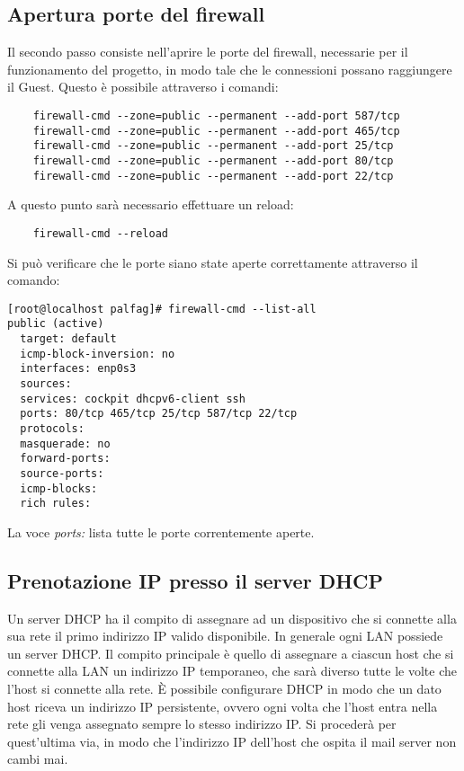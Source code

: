 \subsection{Apertura porte del firewall}

Il secondo passo consiste nell’aprire le porte del firewall, necessarie per il funzionamento del progetto, 
in modo tale che le connessioni possano raggiungere il Guest. Questo è possibile attraverso i comandi:

\begin{verbatim}
    firewall-cmd --zone=public --permanent --add-port 587/tcp
    firewall-cmd --zone=public --permanent --add-port 465/tcp
    firewall-cmd --zone=public --permanent --add-port 25/tcp
    firewall-cmd --zone=public --permanent --add-port 80/tcp
    firewall-cmd --zone=public --permanent --add-port 22/tcp
\end{verbatim}

A questo punto sarà necessario effettuare un reload:

\begin{verbatim}
    firewall-cmd --reload
\end{verbatim}

Si può verificare che le porte siano state aperte correttamente attraverso il comando:
\begin{verbatim}
[root@localhost palfag]# firewall-cmd --list-all
public (active)
  target: default
  icmp-block-inversion: no
  interfaces: enp0s3
  sources: 
  services: cockpit dhcpv6-client ssh
  ports: 80/tcp 465/tcp 25/tcp 587/tcp 22/tcp
  protocols: 
  masquerade: no
  forward-ports: 
  source-ports: 
  icmp-blocks: 
  rich rules: 
\end{verbatim}

La voce \textit{ports:} lista tutte le porte correntemente aperte.

\subsection{Prenotazione IP presso il server DHCP}
Un server DHCP ha il compito di assegnare ad un dispositivo che si connette alla sua rete il primo indirizzo IP 
valido disponibile. In generale ogni LAN possiede un server DHCP. 
Il compito principale è quello di assegnare a ciascun host che si connette alla LAN un indirizzo IP temporaneo, 
che sarà diverso tutte le volte che l’host si connette alla rete. 
È possibile configurare DHCP in modo che un dato host riceva un indirizzo IP persistente, 
ovvero ogni volta che l’host entra nella rete gli venga assegnato sempre lo stesso indirizzo IP. 
Si procederà per quest’ultima via, in modo che l’indirizzo IP dell’host che ospita il mail server non cambi mai.

